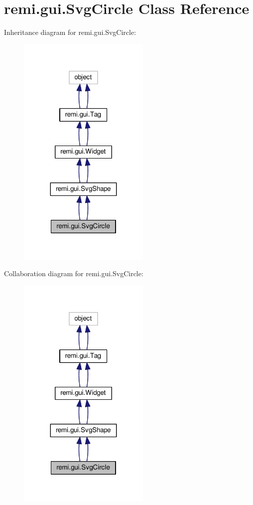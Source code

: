 \hypertarget{classremi_1_1gui_1_1SvgCircle}{}\section{remi.\+gui.\+Svg\+Circle Class Reference}
\label{classremi_1_1gui_1_1SvgCircle}


Inheritance diagram for remi.\+gui.\+Svg\+Circle\+:
\nopagebreak
\begin{figure}[H]
\begin{center}
\leavevmode
\includegraphics[width=179pt]{d4/da5/classremi_1_1gui_1_1SvgCircle__inherit__graph}
\end{center}
\end{figure}


Collaboration diagram for remi.\+gui.\+Svg\+Circle\+:
\nopagebreak
\begin{figure}[H]
\begin{center}
\leavevmode
\includegraphics[width=179pt]{de/dc7/classremi_1_1gui_1_1SvgCircle__coll__graph}
\end{center}
\end{figure}
